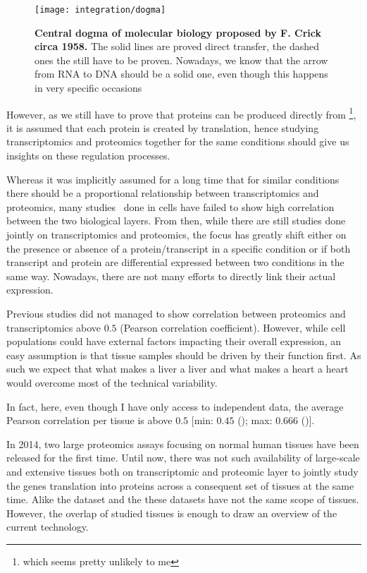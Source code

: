 \begin{figure}%
    \texttt{[image: integration/dogma]}\centering
    \caption[Central dogma of molecular biology proposed by F. Crick circa 1958]
    {\label{fig:dogma}\textbf{Central dogma of molecular biology proposed by
    F. Crick circa 1958.} The solid lines are proved direct transfer, the dashed
    ones the still have to be proven. Nowadays, we know that the arrow from RNA
    to DNA should be a solid one, even though this happens in very specific
    occasions}
\end{figure}

However, as we still have to prove that proteins can be produced directly
from \DNA\footnote{which seems pretty unlikely to me}, it is assumed that
each protein is created by translation, hence studying
transcriptomics and proteomics together for the same conditions should give us
insights on these regulation processes.

Whereas it was implicitly assumed for a long time that for similar conditions
there should be a proportional relationship between transcriptomics and
proteomics, many studies\
done in cells have failed to show high correlation between the two biological
layers. From then, while there are still studies done jointly on transcriptomics
and proteomics, the focus has greatly shift either on the presence or absence of
a protein/transcript in a specific condition or if both transcript and protein
are differential expressed between two conditions in the same way.
Nowadays, there are not many efforts to directly link their actual expression.

Previous studies did not managed to show correlation between proteomics and
transcriptomics above $0.5$ (Pearson correlation coefficient).
However, while cell populations could have external factors impacting their
overall expression, an easy assumption is that tissue samples should be driven
by their function first. As such we expect that what makes a liver a liver and
what makes a heart a heart would overcome most of the technical variability.

In fact, here, even though I have only access to independent data, the average
Pearson correlation per tissue is above $0.5$
[min: $0.45$ (); max: $0.666$ ()].

In 2014, two large proteomics assays focusing on normal human tissues have been
released for the first time.
Until now, there was not such availability of large-scale and extensive tissues
both on transcriptomic and proteomic layer to jointly study the genes
translation into proteins across a consequent set of tissues
at the same time. Alike the  dataset and the 
these datasets have not the same scope of tissues. However, the overlap of
studied tissues is enough to draw an overview of the current technology.


